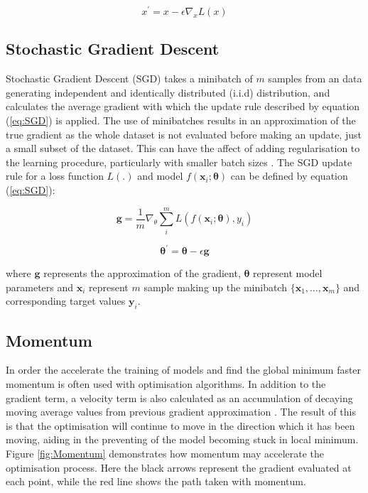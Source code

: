 \begin{equation}\label{eq:gradient_descent}
   x^\prime = x - \epsilon \nabla_x L(x)
\end{equation}

\subsection{Stochastic Gradient Descent}
Stochastic Gradient Descent (SGD) takes a minibatch of $m$ samples from an  data generating independent and identically distributed (i.i.d) distribution, and calculates the average gradient with which the update rule described by equation (\ref{eq:SGD}) is applied.
The use of minibatches results in an approximation of the true gradient as the whole dataset is not evaluated before making an update, just a small subset of the dataset.
This can have the affect of adding regularisation to the learning procedure, particularly with smaller batch sizes \cite{Goodfellow-et-al-2016}.
The SGD update rule for a loss function $L(.)$ and model $f(\bm{x}_i; \bm{\theta})$ can be defined by equation (\ref{eq:SGD}):

\begin{equation*}
    \bm{g} = \frac{1}{m} \nabla_\theta \sum_i^m L(f(\bm{x}_i; \bm{\theta}), y_i)
\end{equation*}

\begin{equation}\label{eq:SGD}
    \bm{\theta}^\prime = \bm{\theta} - \epsilon \bm{g}
\end{equation}

where $\bm{g}$ represents the approximation of the gradient, $\bm{\theta}$ represent model parameters and $\bm{x}_i$ represent $m$ sample making up the minibatch $\{\bm{x}_1, \dots, \bm{x}_m\}$ and corresponding target values $\bm{y}_i$.

\subsection{Momentum}
In order the accelerate the training of models and find the global minimum faster momentum is often used with optimisation algorithms.
In addition to the gradient term, a velocity term is also calculated as an accumulation of decaying moving average values from previous gradient approximation \cite{Goodfellow-et-al-2016}.
The result of this is that the optimisation will continue to move in the direction which it has been moving, aiding in the preventing of the model becoming stuck in local minimum.
Figure \ref{fig:Momentum} demonstrates how momentum may accelerate the optimisation process.
Here the black arrows represent the gradient evaluated at each point, while the red line shows the path taken with momentum.

